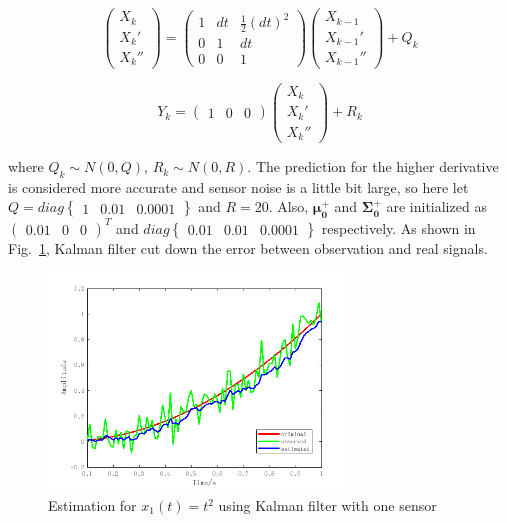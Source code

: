 \documentclass[conference]{IEEEtran}
\begin{document}
	\begin{equation}
		\begin{pmatrix}
		X_{k}\\ 
		{X_{k}}'\\ 
		{X_{k}}''
		\end{pmatrix}=\begin{pmatrix}
		1 &dt  &\frac{1}{2}(dt)^{2} \\ 
		0 &1  &dt \\ 
		0 &0  &1 
		\end{pmatrix}\begin{pmatrix}
		X_{k-1}\\ 
		{X_{k-1}}'\\ 
		{X_{k-1}}''
		\end{pmatrix}+Q_{k}
		\label{eq18}
	\end{equation}
	
	\begin{equation}
	Y_{k}=\begin{pmatrix}
	1 &0  &0 
	\end{pmatrix}\begin{pmatrix}
	X_{k}\\ 
	{X_{k}}'\\ 
	{X_{k}}''
	\end{pmatrix}+R_{k}
	\label{eq19}
	\end{equation}
	
	where $Q_{k}\sim N(0,Q)$, $R_{k}\sim N(0,R)$. The prediction for the higher derivative is considered more accurate and sensor noise is a little bit large, so here let $Q=diag\begin{Bmatrix}
	1 &0.01  &0.0001 
	\end{Bmatrix}$ and $R=20$. Also, $\boldsymbol{\mu_{0}^{+}}$ and $\boldsymbol{\Sigma_{0}^{+}}$ are initialized as $\begin{pmatrix}
	0.01 &0  &0 
	\end{pmatrix}^{T}$ and $diag\begin{Bmatrix}
	0.01 &0.01  &0.0001 
	\end{Bmatrix}$ respectively. As shown in Fig.~\ref{fig1}, Kalman filter cut down the error between observation and real signals. 
	
	\begin{figure}[htbp]
		\centering
		\includegraphics[width=8cm]{fig1.png}
		\caption{Estimation for $x_{1}(t)=t^{2}$ using Kalman filter with one sensor}
		\label{fig1}
	\end{figure}
\end{document}
